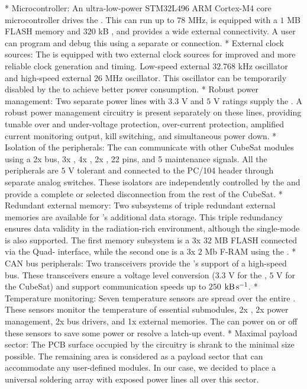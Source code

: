 \begitems
    * {\sbf Microcontroller:} An ultra-low-power STM32L496 ARM Cortex-M4 core microcontroller drives the . This  can run up to $78$ MHz, is equipped with a $1$ MB FLASH memory and $320$ kB , and provides a wide external connectivity. A user can program and debug this  using a separate  or  connection.
    * {\sbf External clock sources:} The  is equipped with two external clock sources for improved and more reliable clock generation and timing. Low-speed external $32.768$ kHz oscillator and high-speed external $26$ MHz oscillator. This oscillator can be temporarily disabled by the  to achieve better power consumption.
    * {\sbf Robust power management:} Two separate power lines with $3.3$ V and $5$ V ratings supply the . A robust power management circuitry is present separately on these lines, providing tunable over and under-voltage protection, over-current protection, amplified current monitoring output, kill switching, and simultaneous power down.
    * {\sbf Isolation of the peripherals:} The  can communicate with other CubeSat modules using a 2x  bus, 3x , 4x , 2x , 22  pins, and 5 maintenance signals. All the peripherals are $5$ V tolerant and connected to the PC/104 header through separate analog switches. These isolators are independently controlled by the  and provide a complete or selected disconnection from the rest of the CubeSat.
    * {\sbf Redundant external memory:} Two subsystems of triple redundant external memories are available for 's additional data storage. This triple redundancy ensures data validity in the radiation-rich environment, although the single-mode is also supported. The first memory subsystem is a 3x $32$ MB FLASH connected via the Quad- interface, while the second one is a 3x $2$ Mb F-RAM using the .
    * {\sbf CAN bus peripherals:} Two  transceivers provide the 's support of a high-speed  bus.  These transceivers ensure a voltage level conversion ($3.3$ V for the , $5$ V for the CubeSat) and support communication speeds up to $250$ $\rm{kB\,s^{-1}}$.
    * {\sbf Temperature monitoring:} Seven  temperature sensors are spread over the entire . These sensors monitor the temperature of essential submodules, 2x , 2x power management, 2x  bus drivers, and 1x external memories. The  can power on or off these sensors to save some power or resolve a latch-up event.
    * {\sbf Maximal payload sector:} The PCB surface occupied by the  circuitry is shrank to the minimal size possible. The remaining area is considered as a payload sector that can accommodate any user-defined modules. In our case, we decided to place a universal soldering array with exposed power lines all over this sector.
\enditems



